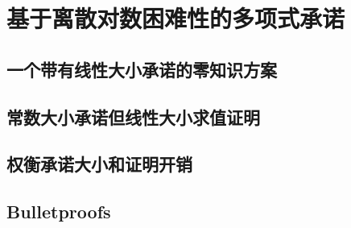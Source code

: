 \chapter{基于离散对数困难性的多项式承诺}\label{chp:14PCDL}

\section{一个带有线性大小承诺的零知识方案}\label{14.1}
\section{常数大小承诺但线性大小求值证明}\label{14.2}
\section{权衡承诺大小和证明开销}\label{14.3}
\section{Bulletproofs}\label{14.4}